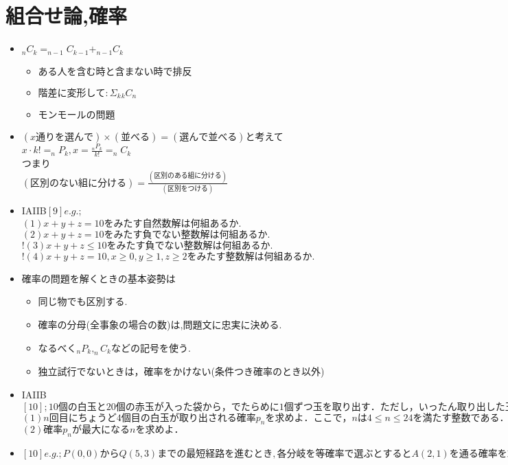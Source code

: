 \documentclass[dvipdfmx,uplatex]{jsarticle}
\begin{document}
\section{組合せ論,確率}
\begin{itemize}
	\item $ _nC_k = _{n-1}C_{k-1} + _{n-1}C_{k}$
	\begin{itemize}
		\item $ ある人を含む時と含まない時で排反$
		\item $ 階差に変形して: Σ_k {}_k C_n$
		\item $ モンモールの問題$
	\end{itemize}
	\item $(x通りを選んで) \times (並べる)=(選んで並べる)$と考えて \\
		$ x \cdot k! = _nP_k,x = \frac{ _nP_k}{k!} = _nC_k$ \\
		つまり \\
		$ (区別のない組に分ける) = \frac{(区別のある組に分ける)}{(区別をつける)}$
	\item 	IAIIB$ [9]e.g.;$ \\
		$ (1) x+y+z=10をみたす自然数解は何組あるか.$ \\
		$ (2) x+y+z=10をみたす負でない整数解は何組あるか.$ \\
		$! (3) x+y+z \leq 10をみたす負でない整数解は何組あるか.$ \\
		$! (4) x+y+z=10,x \geq 0,y \geq 1, z \geq 2をみたす整数解は何組あるか.$ \\
	\item 確率の問題を解くときの基本姿勢は
	\begin{itemize}
		\item 同じ物でも区別する.
		\item 確率の分母(全事象の場合の数)は,問題文に忠実に決める.
		\item なるべく$_nP_k,_nC_k$などの記号を使う.
		\item  独立試行でないときは，確率をかけない(条件つき確率のとき以外)
	\end{itemize}
	\item IAIIB$ [10];10個の白玉と20個の赤玉が入った袋から，でたらめに1個
		ずつ玉を取り出す． ただし， いったん取り出した玉は袋へはもどさ
		ない．$ \\
		$ (1) n回目にちょうど4個目の白玉が取り出される確率 p_n を求めよ．
		ここで， nは4 \leq n \leq 24を満たす整数である．$ \\
		$ (2)確率p_nが最大になるnを求めよ．$
	\item $ [10]e.g.;P(0,0)からQ(5,3)までの最短経路を進むとき,各分岐を等確率で選ぶとするとA(2,1)を通る確率を求めよ.$

\end{itemize}
\end{document}
